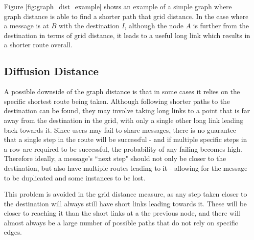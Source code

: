 \documentclass[bsc,frontabs,twoside,singlespacing,parskip,deptreport]{infthesis}     %
\begin{document}
Figure \ref{fig:graph_dist_example} shows an example of a simple graph where graph distance is able to find a shorter path that grid distance. In the case where a message is at $B$ with the destination $I$, although the node $A$ is further from the destination in terms of grid distance, it leads to a useful long link which results in a shorter route overall.

\subsection{Diffusion Distance} \label{subsec:diffusion_dist}

A possible downside of the graph distance is that in some cases it relies on the specific shortest route being taken. Although following shorter paths to the destination can be found, they may involve taking long links to a point that is far away from the destination in the grid, with only a single other long link leading back towards it. Since users may fail to share messages, there is no guarantee that a single step in the route will be successful - and if multiple specific steps in a row are required to be successful, the probability of any failing becomes high. Therefore ideally, a message's ``next step" should not only be closer to the destination, but also have multiple routes leading to it - allowing for the message to be duplicated and some instances to be lost.

This problem is avoided in the grid distance measure, as any step taken closer to the destination will always still have short links leading towards it. These will be closer to reaching it than the short links at a the previous node, and there will almost always be a large number of possible paths that do not rely on specific edges.
\end{document}

